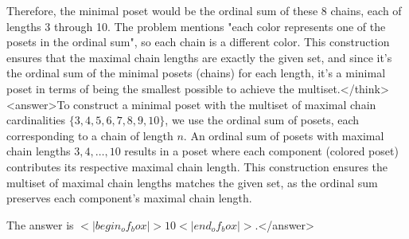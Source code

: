 Therefore, the minimal poset would be the ordinal sum of these 8 chains, each of lengths 3 through 10. The problem mentions "each color represents one of the posets in the ordinal sum", so each chain is a different color. This construction ensures that the maximal chain lengths are exactly the given set, and since it's the ordinal sum of the minimal posets (chains) for each length, it's a minimal poset in terms of being the smallest possible to achieve the multiset.</think><answer>To construct a minimal poset with the multiset of maximal chain cardinalities \(\{3, 4, 5, 6, 7, 8, 9, 10\}\), we use the ordinal sum of posets, each corresponding to a chain of length \(n\). An ordinal sum of posets with maximal chain lengths \(3, 4, \ldots, 10\) results in a poset where each component (colored poset) contributes its respective maximal chain length. This construction ensures the multiset of maximal chain lengths matches the given set, as the ordinal sum preserves each component's maximal chain length.  

The answer is \(<|begin_of_box|>10<|end_of_box|>\).</answer>